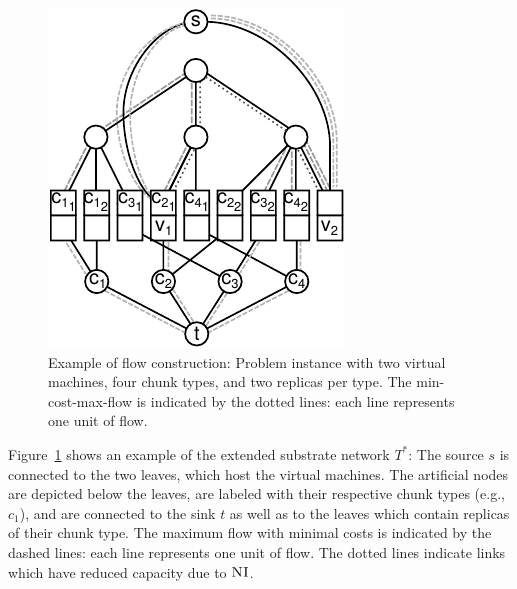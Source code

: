 \documentclass[9pt]{sigcomm-alternate}
\newcommand{\Source}{\ensuremath{s}}
\newcommand{\Sink}{\ensuremath{t}}
\newcommand{\achunk}{\ensuremath{c}}
\newcommand{\CC}{\textsc{NI}}
\newcommand{\Tree}{\ensuremath{T}}
\begin{document}
\begin{figure}
\includegraphics[width=\columnwidth]{figs/flow_ma_cv}
\caption{Example of flow construction: Problem instance with two virtual machines, four chunk
types, and two replicas per type. The min-cost-max-flow 
is indicated by the dotted lines: each line represents one unit of flow.}
\label{fig:flow_construction}
\end{figure}

Figure~\ref{fig:flow_construction} shows an example of the extended substrate
network $\Tree^*$: The source $\Source$ is connected to the two leaves, which host the
virtual machines. The artificial nodes are depicted below the leaves, are labeled with
their respective chunk types (e.g., $\achunk_1$), and are connected to the sink
$\Sink$ as well as to the leaves which contain replicas of their chunk type. 
The
maximum flow with minimal costs is indicated by the dashed lines: each line
represents one unit of flow. The dotted lines indicate links which have reduced
capacity due to $\CC$.
\end{document}

